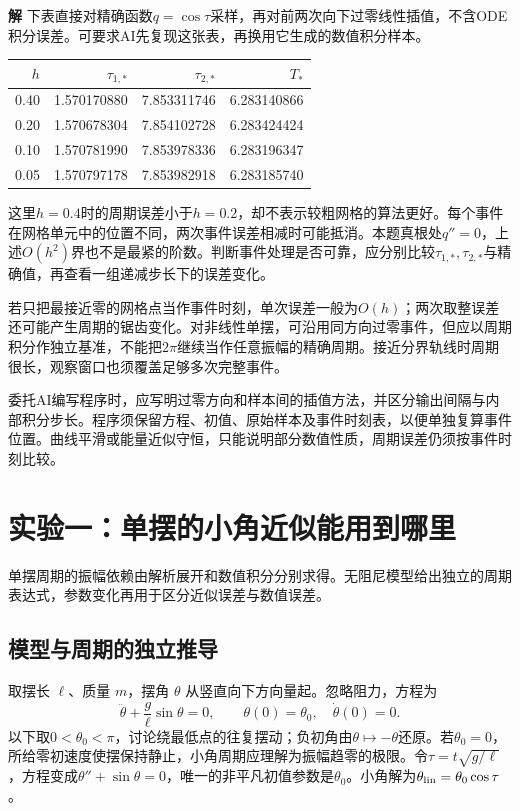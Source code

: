 \documentclass[11pt,openany,fontset=fandol]{ctexbook}
\theoremstyle{plain}\newtheorem{theorem}{定理}[chapter]\newtheorem{proposition}[theorem]{命题}
\theoremstyle{definition}\newtheorem{definition}{定义}[chapter]\newtheorem{example}{例}[chapter]
\theoremstyle{remark}\newtheorem*{remark}{说明}
\newcommand{\SolutionStart}{\par\nobreak\medskip\nobreak\noindent\textbf{解}\quad\ignorespaces}
\newenvironment{solution}{\SolutionStart}{\par\medskip}
\begin{document}
\begin{solution}
下表直接对精确函数$q=\cos\tau$采样，再对前两次向下过零线性插值，不含ODE积分误差。可要求AI先复现这张表，再换用它生成的数值积分样本。
\begin{center}\small
\begin{tabular}{rrrr}\toprule
$h$ & $\tau_{1,*}$ & $\tau_{2,*}$ & $T_*$\\\midrule
0.40 & 1.570170880 & 7.853311746 & 6.283140866 \\
0.20 & 1.570678304 & 7.854102728 & 6.283424424 \\
0.10 & 1.570781990 & 7.853978336 & 6.283196347 \\
0.05 & 1.570797178 & 7.853982918 & 6.283185740 \\
\bottomrule\end{tabular}\end{center}
这里$h=0.4$时的周期误差小于$h=0.2$，却不表示较粗网格的算法更好。每个事件在网格单元中的位置不同，两次事件误差相减时可能抵消。本题真根处$q''=0$，上述$O(h^2)$界也不是最紧的阶数。判断事件处理是否可靠，应分别比较$\tau_{1,*},\tau_{2,*}$与精确值，再查看一组递减步长下的误差变化。

若只把最接近零的网格点当作事件时刻，单次误差一般为$O(h)$；两次取整误差还可能产生周期的锯齿变化。对非线性单摆，可沿用同方向过零事件，但应以周期积分作独立基准，不能把$2\pi$继续当作任意振幅的精确周期。接近分界轨线时周期很长，观察窗口也须覆盖足够多次完整事件。

委托AI编写程序时，应写明过零方向和样本间的插值方法，并区分输出间隔与内部积分步长。程序须保留方程、初值、原始样本及事件时刻表，以便单独复算事件位置。曲线平滑或能量近似守恒，只能说明部分数值性质，周期误差仍须按事件时刻比较。

\end{solution}


\section{实验一：单摆的小角近似能用到哪里}
单摆周期的振幅依赖由解析展开和数值积分分别求得。无阻尼模型给出独立的周期表达式，参数变化再用于区分近似误差与数值误差。

\subsection{模型与周期的独立推导}
取摆长 $\ell$、质量 $m$，摆角 $\theta$ 从竖直向下方向量起。忽略阻力，方程为
\[
\ddot\theta+\frac g\ell\sin\theta=0,\qquad\theta(0)=\theta_0,\quad\dot\theta(0)=0.
\]
以下取$0<\theta_0<\pi$，讨论绕最低点的往复摆动；负初角由$\theta\mapsto-\theta$还原。若$\theta_0=0$，所给零初速度使摆保持静止，小角周期应理解为振幅趋零的极限。令$\tau=t\sqrt{g/\ell}$，方程变成$\theta''+\sin\theta=0$，唯一的非平凡初值参数是$\theta_0$。小角解为$\theta_{\rm lin}=\theta_0\cos\tau$。
\end{document}
